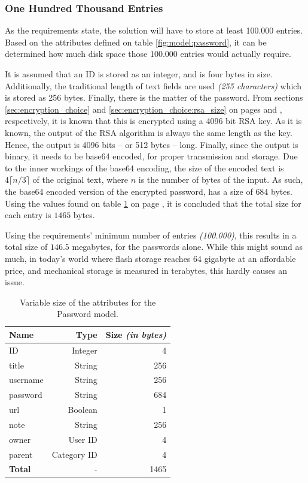 			\subsubsection{One Hundred Thousand Entries}
				\label{sec:model:password:size}
				As the requirements state, the solution will have to store at least 100.000 entries. Based on the attributes defined on table \ref{fig:model:password}, it can be determined how much disk space those 100.000 entries would actually require.

				It is assumed that an ID is stored as an integer, and is four bytes in size. Additionally, the traditional length of text fields are used \emph{(255 characters)} which is stored as 256 bytes. Finally, there is the matter of the password. From sections \ref{sec:encryption_choice} and \ref{sec:encryption_choice:rsa_size} on pages \pageref{sec:encryption_choice} and \pageref{sec:encryption_choice:rsa_size}, respectively, it is known that this is encrypted using a 4096 bit RSA key. As it is known, the output of the RSA algorithm is always the same length as the key. Hence, the output is 4096 bits -- or 512 bytes -- long. Finally, since the output is binary, it needs to be base64 encoded, for proper transmission and storage. Due to the inner workings of the base64 encoding, the size of the encoded text is $4\lceil{n/3}\rceil$ of the original text, where $n$ is the number of bytes of the input. As such, the base64 encoded version of the encrypted password, has a size of $684$ bytes. Using the values found on table \ref{tab:model:password:size} on page \pageref{tab:model:password:size}, it is concluded that the total size for each entry is $1465$ bytes.

				Using the requirements' minimum number of entries \emph{(100.000)}, this results in a total size of $146.5$ megabytes, for the passwords alone. While this might sound as much, in today's world where flash storage reaches $64$ gigabyte at an affordable price, and mechanical storage is measured in terabytes, this hardly causes an issue.

				\begin{table}
					\centering
					\begin{tabular}{l | r | r}
						\textbf{Name}  			& \textbf{Type} 		& \textbf{Size \emph{(in bytes)}} 		\\
						\hline
						ID 						& Integer 			& 4						\\
						title 					& String 			& 256					\\
						username 				& String 			& 256					\\
						password 				& String 			& 684					\\
						url						& Boolean 			& 1						\\
						note  					& String 			& 256					\\
						owner 					& User ID 			& 4						\\
						parent 					& Category ID 		& 4						\\
						\hline\hline
						\textbf{Total} 			& - 				& 1465
					\end{tabular}
					\caption{Variable size of the attributes for the Password model.}
					\label{tab:model:password:size}
				\end{table}


